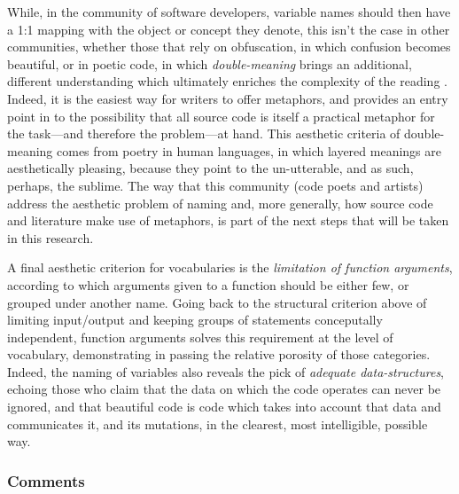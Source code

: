 While, in the community of software developers, variable names should then have a 1:1 mapping with the object or concept they denote, this isn't the case in other communities, whether those that rely on obfuscation, in which confusion becomes beautiful, or in poetic code, in which \emph{double-meaning} brings an additional, different understanding which ultimately enriches the complexity of the reading \citep{knuth_literate_1984}. Indeed, it is the easiest way for writers to offer metaphors, and provides an entry point in to the possibility that all source code is itself a practical metaphor for the task—and therefore the problem—at hand. This aesthetic criteria of double-meaning comes from poetry in human languages, in which layered meanings are aesthetically pleasing, because they point to the un-utterable, and as such, perhaps, the sublime. The way that this community (code poets and artists) address the aesthetic problem of naming and, more generally, how source code and literature make use of metaphors, is part of the next steps that will be taken in this research.

A final aesthetic criterion for vocabularies is the \emph{limitation of function arguments}, according to which arguments given to a function should be either few, or grouped under another name. Going back to the structural criterion above of limiting input/output and keeping groups of statements conceputally independent, function arguments solves this requirement at the level of vocabulary, demonstrating in passing the relative porosity of those categories. Indeed, the naming of variables also reveals the pick of \emph{adequate data-structures}, echoing those who claim that the data on which the code operates can never be ignored, and that beautiful code is code which takes into account that data and communicates it, and its mutations, in the clearest, most intelligible, possible way.

\subsubsection{Comments}
\label{subsubsec:framework-comments}

